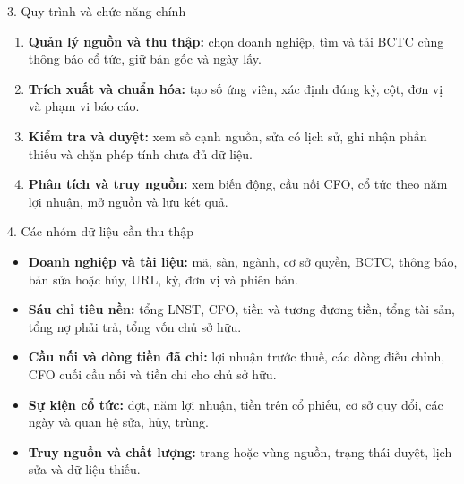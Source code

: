 \documentclass[t,aspectratio=169,11pt]{beamer}
\begin{document}
\begin{frame}{3. Quy trình và chức năng chính}
  \begin{enumerate}
    \item \textbf{Quản lý nguồn và thu thập:} chọn doanh nghiệp, tìm và tải
      BCTC cùng thông báo cổ tức, giữ bản gốc và ngày lấy.
    \item \textbf{Trích xuất và chuẩn hóa:} tạo số ứng viên, xác định đúng
      kỳ, cột, đơn vị và phạm vi báo cáo.
    \item \textbf{Kiểm tra và duyệt:} xem số cạnh nguồn, sửa có lịch sử,
      ghi nhận phần thiếu và chặn phép tính chưa đủ dữ liệu.
    \item \textbf{Phân tích và truy nguồn:} xem biến động, cầu nối CFO,
      cổ tức theo năm lợi nhuận, mở nguồn và lưu kết quả.
  \end{enumerate}
\end{frame}

\begin{frame}{4. Các nhóm dữ liệu cần thu thập}
  \begin{itemize}
    \item \textbf{Doanh nghiệp và tài liệu:} mã, sàn, ngành, cơ sở quyền,
      BCTC, thông báo, bản sửa hoặc hủy, URL, kỳ, đơn vị và phiên bản.
    \item \textbf{Sáu chỉ tiêu nền:} tổng LNST, CFO, tiền và tương đương tiền,
      tổng tài sản, tổng nợ phải trả, tổng vốn chủ sở hữu.
    \item \textbf{Cầu nối và dòng tiền đã chi:} lợi nhuận trước thuế,
      các dòng điều chỉnh, CFO cuối cầu nối và tiền chi cho chủ sở hữu.
    \item \textbf{Sự kiện cổ tức:} đợt, năm lợi nhuận, tiền trên cổ phiếu,
      cơ sở quy đổi, các ngày và quan hệ sửa, hủy, trùng.
    \item \textbf{Truy nguồn và chất lượng:} trang hoặc vùng nguồn,
      trạng thái duyệt, lịch sửa và dữ liệu thiếu.
  \end{itemize}
\end{frame}
\end{document}
